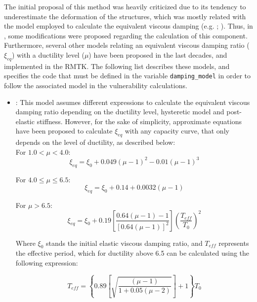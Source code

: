 The initial proposal of this method was heavily criticized due to its tendency to underestimate the deformation of the structures, which was mostly related with the model employed to calculate the equivalent viscous damping (e.g. \cite{Fajfar1999}; \cite{ChopraGoel2010}). Thus, in \cite{FEMA4402005}, some modifications were proposed regarding the calculation of this component. Furthermore, several other models relating an equivalent viscous damping ratio ($\xi_{eq}$) with a ductility level ($\mu$) have been proposed in the last decades, and implemented in the RMTK. The following list describes these models, and specifies the code that must be defined in the variable \verb=damping_model= in order to follow the associated model in the vulnerability calculations.\\

\begin{itemize}
\item \cite{FEMA4402005}: This model assumes different expressions to calculate the equivalent viscous damping ratio depending on the ductility level, hysteretic model and post-elastic stiffness. However, for the sake of simplicity, approximate equations have been proposed to calculate $\xi_{eq}$ with any capacity curve, that only depends on the level of ductility, as described below:\\

For $1.0 < \mu < 4.0$:
\begin{equation}
	\xi_{eq} = \xi_0 + 0.049\left(\mu-1\right)^2-0.01\left(\mu-1\right)^3
\end{equation}

For $4.0 \le \mu \le 6.5$:
\begin{equation}
	\xi_{eq} = \xi_0 + 0.14 + 0.0032 \left(\mu-1\right)
\end{equation}

For $ \mu > 6.5$:
\begin{equation}
	\xi_{eq} = \xi_0 + 0.19\left[\frac{0.64\left(\mu-1\right)-1}{\left[0.64\left(\mu-1\right)\right]^2}\right]\left(\frac{T_{eff}}{T_0}\right)^2
\end{equation}

Where $\xi_0$ stands the initial elastic viscous damping ratio, and $T_{eff}$ represents the effective period, which for ductility above 6.5 can be calculated using the following expression:

\begin{equation}
	T_{eff} = \left\{0.89\left[\sqrt{\frac{(\mu-1)}{1+0.05(\mu-2)}}\right]+1\right\}T_0
\end{equation}


\end{itemize}
